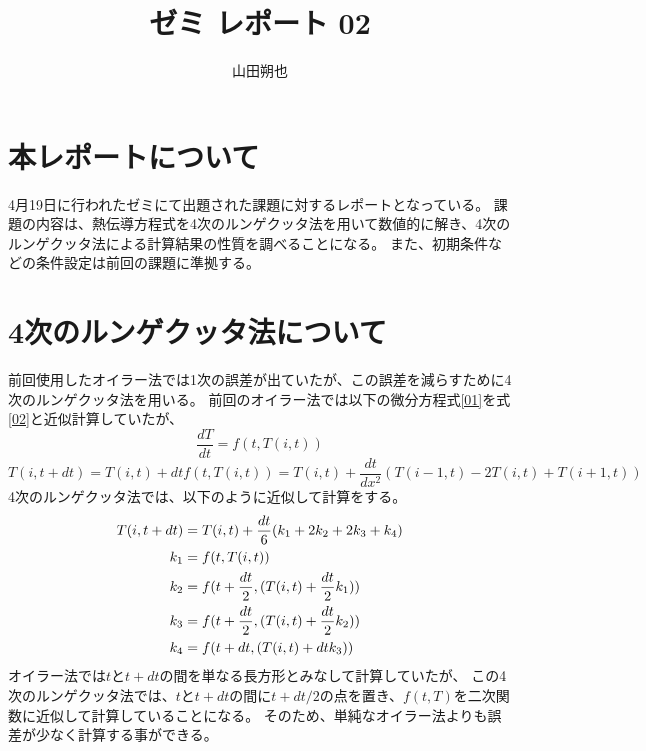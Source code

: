 \documentclass{jsarticle}
\begin{document}
\title{ゼミ レポート 02}
\author{山田朔也}
\maketitle

\section{本レポートについて}
4月19日に行われたゼミにて出題された課題に対するレポートとなっている。
課題の内容は、熱伝導方程式を4次のルンゲクッタ法を用いて数値的に解き、4次のルンゲクッタ法による計算結果の性質を調べることになる。
また、初期条件などの条件設定は前回の課題に準拠する。

\section{4次のルンゲクッタ法について}
前回使用したオイラー法では1次の誤差が出ていたが、この誤差を減らすために4次のルンゲクッタ法を用いる。
前回のオイラー法では以下の微分方程式\ref{01}を式\ref{02}と近似計算していたが、
\begin{equation}
	\frac{dT}{dt} = f(t, T(i,t))	\label{01}
\end{equation}
\begin{equation}
	T(i,t+dt) = T(i,t) + dtf(t, T(i,t)) = T(i,t) + \frac{dt}{dx^2} (T(i-1,t) - 2T(i,t) + T(i+1,t))	\label{02}
\end{equation}
4次のルンゲクッタ法では、以下のように近似して計算をする。
\begin{align}
	T(i,t+dt) &= T(i,t) + \frac{dt}{6}(k_1 + 2k_2 + 2k_3 + k_4) \label{03} \\
	k_1		  &= f(t, T(i,t)) \notag \\
	k_2		  &= f(t+\frac{dt}{2}, (T(i,t) + \frac{dt}{2}k_1)) \notag \\
	k_3		  &= f(t+\frac{dt}{2}, (T(i,t) + \frac{dt}{2}k_2)) \notag \\
	k_4		  &= f(t+dt, (T(i,t) + dtk_3))	\notag
\end{align}
オイラー法では$t$と$t+dt$の間を単なる長方形とみなして計算していたが、
この4次のルンゲクッタ法では、$t$と$t+dt$の間に$t+dt/2$の点を置き、$f(t, T)$を二次関数に近似して計算していることになる。
そのため、単純なオイラー法よりも誤差が少なく計算する事ができる。
\end{document}
